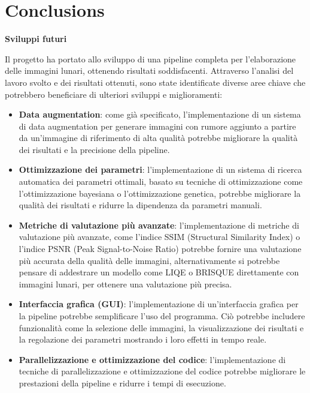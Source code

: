 \chapter*{Conclusions}


\textbf{Sviluppi futuri}

Il progetto ha portato allo sviluppo di una pipeline completa per l'elaborazione delle immagini lunari, ottenendo risultati soddisfacenti. Attraverso l'analisi del lavoro svolto e dei risultati ottenuti, sono state identificate diverse aree chiave che potrebbero beneficiare di ulteriori sviluppi e miglioramenti:

\begin{itemize}
    \item \textbf{Data augmentation}: come già specificato, l'implementazione di un sistema di data augmentation per generare immagini con rumore aggiunto a partire da un'immagine di riferimento di alta qualità potrebbe migliorare la qualità dei risultati e la precisione della pipeline.
    
    \item \textbf{Ottimizzazione dei parametri}: l'implementazione di un sistema di ricerca automatica dei parametri ottimali, basato su tecniche di ottimizzazione come l'ottimizzazione bayesiana o l'ottimizzazione genetica, potrebbe migliorare la qualità dei risultati e ridurre la dipendenza da parametri manuali.
    
    \item \textbf{Metriche di valutazione più avanzate}: l'implementazione di metriche di valutazione più avanzate, come l'indice SSIM (Structural Similarity Index) o l'indice PSNR (Peak Signal-to-Noise Ratio) potrebbe fornire una valutazione più accurata della qualità delle immagini, alternativamente si potrebbe pensare di addestrare un modello come LIQE o BRISQUE direttamente con immagini lunari, per ottenere una valutazione più precisa.
    
    \item \textbf{Interfaccia grafica (GUI)}: l'implementazione di un'interfaccia grafica per la pipeline potrebbe semplificare l'uso del programma. Ciò potrebbe includere funzionalità come la selezione delle immagini, la visualizzazione dei risultati e la regolazione dei parametri mostrando i loro effetti in tempo reale.
    
    \item \textbf{Parallelizzazione e ottimizzazione del codice}: l'implementazione di tecniche di parallelizzazione e ottimizzazione del codice potrebbe migliorare le prestazioni della pipeline e ridurre i tempi di esecuzione.
\end{itemize}

